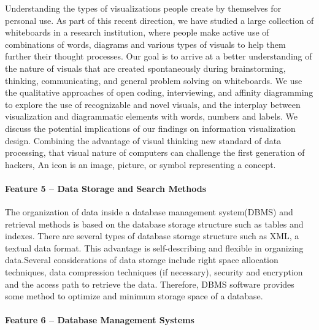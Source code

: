 \documentclass[a4paper]{article} %
\begin{document}
	Understanding the types of visualizations people create by themselves for personal use. As part of this recent direction, we have studied a large collection of whiteboards in a research institution, where people make active use of combinations of words, diagrams and various types of visuals to help them further their thought processes. Our goal is to arrive at a better understanding of the nature of visuals that are created spontaneously during brainstorming, thinking, communicating, and general problem solving on whiteboards.\cite{Blascheck2016} We use the qualitative approaches of open coding, interviewing, and affinity diagramming to explore the use of recognizable and novel visuals, and the interplay between visualization and diagrammatic elements with words, numbers and labels. We discuss the potential implications of our findings on information visualization design. Combining the advantage of visual thinking new standard of data processing, that visual nature of computers can challenge the first generation of hackers, An icon is an image, picture, or symbol representing a concept.\cite{Szpunar2010}
	
	\paragraph*{Feature 5 -- Data Storage and Search Methods}
	\label{task1:feature5}
	
	The organization of data inside a database management system(DBMS) and retrieval methods is based on the database storage structure such as tables and indexes. 
	There are several types of database storage structure such as XML, a textual data format. 
	This advantage is self-describing and flexible in organizing data.\cite{ISI:000253400700005}Several considerations of data storage include right space allocation techniques, data compression techniques (if necessary), security and encryption and the access path to retrieve the data. 
	Therefore, DBMS software provides some method to optimize and  minimum storage space of a database.
	
	\paragraph*{Feature 6 -- Database Management Systems}
	\label{task1:feature6}
	
\end{document}

